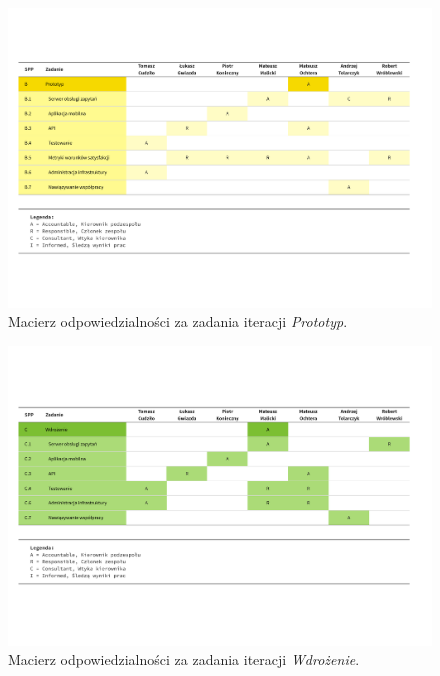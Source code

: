 \begin{figure}[p]
    \ContinuedFloat
    \includegraphics[angle=270, trim=1cm 1cm 1cm 1cm, width=\textwidth]{./figury/organizacja-projektu/macierz-odpowiedzialnosci-B-prototyp}
    \caption[]{Macierz odpowiedzialności za zadania iteracji \emph{Prototyp}.}
\end{figure}

\begin{figure}[p]
    \ContinuedFloat
    \includegraphics[angle=270, trim=1cm 1cm 1cm 1cm, width=\textwidth]{./figury/organizacja-projektu/macierz-odpowiedzialnosci-C-wdrozenie}
    \caption[]{Macierz odpowiedzialności za zadania iteracji \emph{Wdrożenie}.}
\end{figure}
